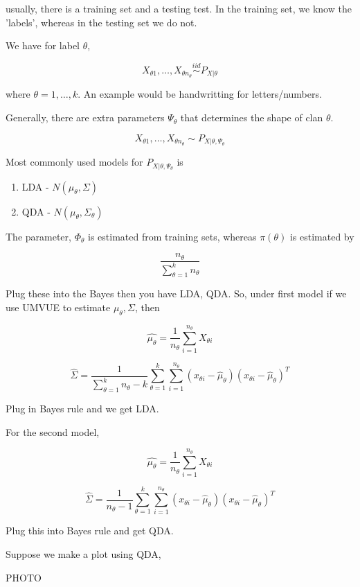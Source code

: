 \documentclass[11pt,fleqn]{book} %
\begin{document}
usually, there is a training set and a testing test. In the training set, we know the 'labels', whereas in the testing set we do not. 

We have for label $\theta$, 

		$$X_{\theta 1}, \dots, X_{\theta n_{\theta}} \stackrel{iid}{\sim} P_{X|\theta}$$

where $\theta = 1, \dots, k$. An example would be handwritting for letters/numbers. 

Generally, there are extra parameters $\Psi_\theta$ that determines the shape of clan $\theta$. 

		$$X_{\theta 1}, \dots, X_{\theta n_\theta} \sim P_{X|\theta, \Psi_\theta} $$

Most commonly used models for $P_{X|\theta, \Psi_\theta}$ is 

		\begin{enumerate}
			\item LDA - $N(\mu_\theta, \Sigma)$
			\item QDA - $N(\mu_\theta, \Sigma_\theta)$
		\end{enumerate}

The parameter, $\Phi_\theta$ is estimated from training sets, whereas $\pi(\theta)$ is estimated by 

		$$\frac{n_\theta}{\sum^k_{\theta = 1} n_\theta} $$

Plug these into the Bayes then you have LDA, QDA. So, under first model if we use UMVUE to estimate $\mu_\theta, \Sigma$, then 

		$$\hat{\mu_\theta} = \frac{1}{n_\theta} \sum^{n_\theta}_{i = 1} X_{\theta i} $$

		$$\hat{\Sigma} = \frac{1}{\sum^k_{\theta = 1} n_\theta - k} \sum^k_{\theta = 1} \sum^{n_\theta}_{i = 1} (x_{\theta i} - \hat{\mu}_\theta )(x_{\theta i} - \hat{\mu}_\theta)^T $$

Plug in Bayes rule and we get LDA. 

For the second model, 

		$$\hat{\mu_\theta} = \frac{1}{n_\theta} \sum^{n_\theta}_{i = 1} X_{\theta i} $$

		$$\hat{\Sigma} = \frac{1}{n_\theta - 1} \sum^k_{\theta = 1} \sum^{n_\theta}_{i = 1} (x_{\theta i} - \hat{\mu}_\theta )(x_{\theta i} - \hat{\mu}_\theta)^T $$

Plug this into Bayes rule and get QDA. 


Suppose we make a plot using QDA, 

		PHOTO
\end{document}
